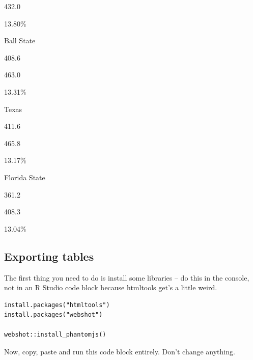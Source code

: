\documentclass[]{book}
\newenvironment{Shaded}{\begin{snugshade}}{\end{snugshade}}
\newcommand{\CharTok}[1]{\textcolor[rgb]{0.31,0.60,0.02}{#1}}
\newcommand{\ControlFlowTok}[1]{\textcolor[rgb]{0.13,0.29,0.53}{\textbf{#1}}}
\newcommand{\DataTypeTok}[1]{\textcolor[rgb]{0.13,0.29,0.53}{#1}}
\newcommand{\FloatTok}[1]{\textcolor[rgb]{0.00,0.00,0.81}{#1}}
\newcommand{\KeywordTok}[1]{\textcolor[rgb]{0.13,0.29,0.53}{\textbf{#1}}}
\newcommand{\NormalTok}[1]{#1}
\newcommand{\OtherTok}[1]{\textcolor[rgb]{0.56,0.35,0.01}{#1}}
\newcommand{\StringTok}[1]{\textcolor[rgb]{0.31,0.60,0.02}{#1}}
\begin{document}
{432.0}

13.80\%

Ball State

{408.6}

{463.0}

13.31\%

Texas

{411.6}

{465.8}

13.17\%

Florida State

{361.2}

{408.3}

13.04\%

\hypertarget{exporting-tables}{%
\subsection{Exporting tables}\label{exporting-tables}}

The first thing you need to do is install some libraries -- do this in the console, not in an R Studio code block because htmltools get's a little weird.

\begin{verbatim}
install.packages("htmltools")
install.packages("webshot")

webshot::install_phantomjs()
\end{verbatim}

Now, copy, paste and run this code block entirely. Don't change anything.

\begin{Shaded}
\end{Shaded}
\end{document}
